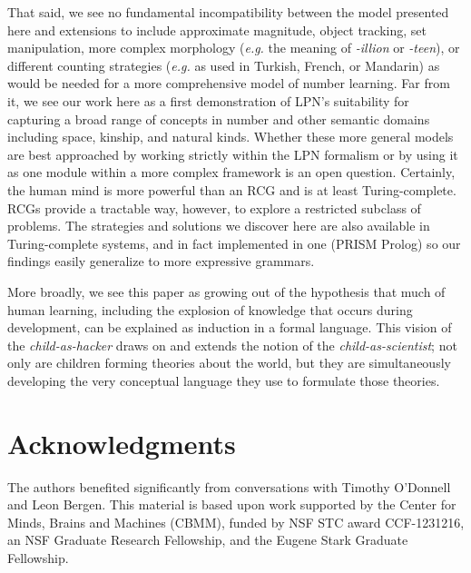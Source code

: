 \documentclass[10pt,letterpaper]{article}
\begin{document}
That said, we see no fundamental incompatibility between the model
presented here and extensions to include approximate magnitude, object
tracking, set manipulation, more complex morphology ({\it e.g.} the
meaning of \emph{-illion} or \emph{-teen}), or different counting
strategies ({\it e.g.} as used in Turkish, French, or Mandarin) as
would be needed for a more comprehensive model of number learning. Far
from it, we see our work here as a first demonstration of LPN's
suitability for capturing a broad range of concepts in number and
other semantic domains including space, kinship, and natural kinds.
Whether these more general models are best approached by working
strictly within the LPN formalism or by using it as one module within
a more complex framework is an open question. Certainly, the human
mind is more powerful than an RCG and is at least Turing-complete.
RCGs provide a tractable way, however, to explore a restricted
subclass of problems. The strategies and solutions we discover here
are also available in Turing-complete systems, and in fact implemented
in one (PRISM Prolog) so our findings easily generalize to more
expressive grammars.

More broadly, we see this paper as growing out of the hypothesis that
much of human learning, including the explosion of knowledge that
occurs during development, can be explained as induction in a formal
language. This vision of the \emph{child-as-hacker} draws on and
extends the notion of the \emph{child-as-scientist}; not only are
children forming theories about the world, but they are simultaneously
developing the very conceptual language they use to formulate those
theories.

\section{Acknowledgments}

The authors benefited significantly from conversations with Timothy
O'Donnell and Leon Bergen. This material is based upon work supported
by the Center for Minds, Brains and Machines (CBMM), funded by NSF STC
award CCF-1231216, an NSF Graduate Research Fellowship, and the Eugene
Stark Graduate Fellowship.




\setlength{\bibleftmargin}{.125in}
\setlength{\bibindent}{-\bibleftmargin}

\end{document}
